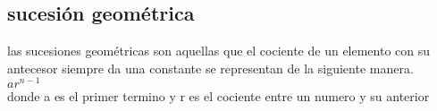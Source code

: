 \subsection{sucesión geométrica}
las sucesiones geométricas son aquellas que el cociente de un elemento con su antecesor siempre da una constante se representan de la siguiente manera.
\\$ ar^{n-1}$
\\donde a es el primer termino y r es el cociente entre un numero y su anterior